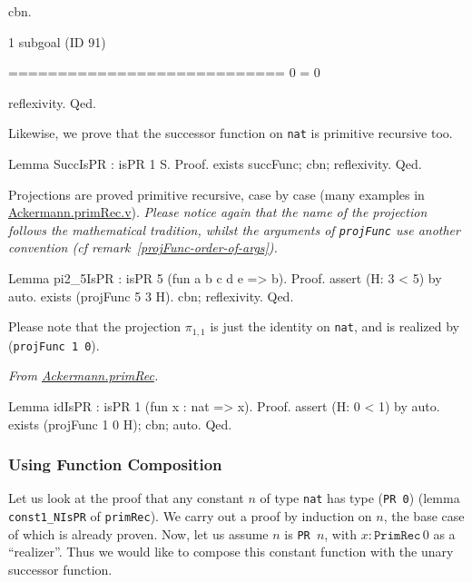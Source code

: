 \begin{Coqsrc}
  cbn.
\end{Coqsrc}


\begin{Coqanswer}
1 subgoal (ID 91)
  
  ============================
  0 = 0
\end{Coqanswer}

\begin{Coqsrc}
  reflexivity.
Qed.
\end{Coqsrc}


Likewise, we prove that the successor function on \texttt{nat} is primitive recursive too.

\begin{Coqsrc}
Lemma SuccIsPR : isPR 1 S.
Proof.
  exists succFunc; cbn; reflexivity.
Qed.
\end{Coqsrc}

Projections are proved primitive recursive, case by case (many examples in 
\href{../theories/html/hydras.Ackermann.primRec.html}{Ackermann.primRec.v}).
\emph{Please notice again that the name of the projection follows the mathematical tradition, 
whilst the arguments of  \texttt{projFunc} use another convention (\emph{cf} remark~\vref{projFunc-order-of-args}).}

\begin{Coqsrc}
Lemma pi2_5IsPR : isPR 5 (fun a b c d e => b).
Proof.
 assert (H: 3 < 5) by auto.
 exists (projFunc 5 3 H).
 cbn; reflexivity.
Qed.
\end{Coqsrc}

Please note that the projection $\pi_{1,1}$ is just the identity on \texttt{nat}, and is realized by 
(\texttt{projFunc 1 0}).


\vspace{4pt}
\noindent
\emph{From \href{../theories/html/hydras.Ackermann.primRec.html}{Ackermann.primRec}.}

\begin{Coqsrc}
Lemma idIsPR : isPR 1 (fun x : nat => x).
Proof.
  assert (H: 0 < 1) by auto.
  exists (projFunc 1 0 H); cbn; auto.
Qed.
\end{Coqsrc}

\subsubsection{Using Function Composition}

Let us look at the proof that any constant $n$ of type \texttt{nat} has type (\texttt{PR 0})
(lemma  \texttt{const1\_NIsPR} of \texttt{primRec}). We carry out a proof by induction on $n$, the base case of which is already proven.
Now, let us assume $n$ is \texttt{PR $n$}, with $x:\texttt{PrimRec}\,0$ as a ``realizer''.
Thus we would like to compose this constant function with the unary successor function.

